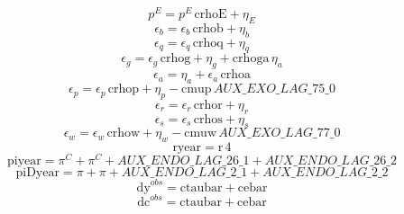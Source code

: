 \begin{dmath}
{{p^{E}}}={{p^{E}}}\, {{\mathrm{crhoE}}}+{{\eta_{E}}}
\end{dmath}
\begin{dmath}
{{\epsilon_{b}}}={{\epsilon_{b}}}\, {{\mathrm{crhob}}}+{{\eta_{b}}}
\end{dmath}
\begin{dmath}
{{\epsilon_{q}}}={{\epsilon_{q}}}\, {{\mathrm{crhoq}}}+{{\eta_{q}}}
\end{dmath}
\begin{dmath}
{{\epsilon_{g}}}={{\epsilon_{g}}}\, {{\mathrm{crhog}}}+{{\eta_{g}}}+{{\mathrm{crhoga}}}\, {{\eta_{a}}}
\end{dmath}
\begin{dmath}
{{\epsilon_{a}}}={{\eta_{a}}}+{{\epsilon_{a}}}\, {{\mathrm{crhoa}}}
\end{dmath}
\begin{dmath}
{{\epsilon_{p}}}={{\epsilon_{p}}}\, {{\mathrm{crhop}}}+{{\eta_{p}}}-{{\mathrm{cmup}}}\, {AUX\_EXO\_LAG\_75\_0}
\end{dmath}
\begin{dmath}
{{\epsilon_{r}}}={{\epsilon_{r}}}\, {{\mathrm{crhor}}}+{{\eta_{r}}}
\end{dmath}
\begin{dmath}
{{\epsilon_{s}}}={{\epsilon_{s}}}\, {{\mathrm{crhos}}}+{{\eta_{s}}}
\end{dmath}
\begin{dmath}
{{\epsilon_{w}}}={{\epsilon_{w}}}\, {{\mathrm{crhow}}}+{{\eta_{w}}}-{{\mathrm{cmuw}}}\, {AUX\_EXO\_LAG\_77\_0}
\end{dmath}
\begin{dmath}
{{\mathrm{ryear}}}={{\mathrm{r}}}\, 4
\end{dmath}
\begin{dmath}
{{\mathrm{piyear}}}={{\pi^{C}}}+{{\pi^{C}}}+{AUX\_ENDO\_LAG\_26\_1}+{AUX\_ENDO\_LAG\_26\_2}
\end{dmath}
\begin{dmath}
{{\mathrm{piDyear}}}={{\pi}}+{{\pi}}+{AUX\_ENDO\_LAG\_2\_1}+{AUX\_ENDO\_LAG\_2\_2}
\end{dmath}
\begin{dmath}
{{\mathrm{dy}^{obs}}}={{\mathrm{ctaubar}}}+{{\mathrm{cebar}}}
\end{dmath}
\begin{dmath}
{{\mathrm{dc}^{obs}}}={{\mathrm{ctaubar}}}+{{\mathrm{cebar}}}
\end{dmath}
